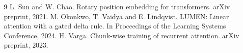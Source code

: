 \documentclass{article}
\begin{document}
\begin{thebibliography}{9}
 L. Sun and W. Chao. Rotary position embedding for transformers. arXiv preprint, 2021.
 M. Okonkwo, T. Vaidya and E. Lindqvist. LUMEN: Linear attention with a gated delta rule. In Proceedings of the Learning Systems Conference, 2024.
 H. Varga. Chunk-wise training of recurrent attention. arXiv preprint, 2023.
\end{thebibliography}
\end{document}
